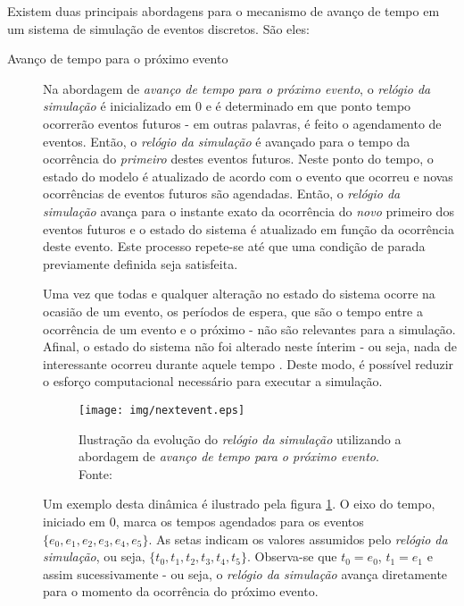 Existem duas principais abordagens para o mecanismo de avanço de tempo em um sistema de simulação de eventos discretos. São eles:

\begin{description}
\item[Avanço de tempo para o próximo evento] \hfill

Na abordagem de \textit{avanço de tempo para o próximo evento}, o
\textit{relógio da simulação} é inicializado em 0 e é determinado em que ponto
tempo ocorrerão eventos futuros - em outras palavras, é feito o agendamento de
eventos. Então, o \textit{relógio da simulação} é avançado para o tempo da
ocorrência do \textit{primeiro} destes eventos futuros. Neste ponto do tempo, o
estado do modelo é atualizado de acordo com o evento que ocorreu e novas
ocorrências de eventos futuros são agendadas. Então, o \textit{relógio da
simulação} avança para o instante exato da ocorrência do \textit{novo} primeiro
dos eventos futuros e o estado do sistema é atualizado em função da ocorrência
deste evento. Este processo repete-se até que uma condição de parada previamente
definida seja satisfeita.

Uma vez que todas e qualquer alteração no estado do sistema ocorre na ocasião de
um evento, os períodos de espera, que são o tempo entre a ocorrência de um
evento e o próximo - não são relevantes para a simulação. Afinal, o estado do
sistema não foi alterado neste ínterim - ou seja, nada de interessante ocorreu
durante aquele tempo \cite{Sim}. Deste modo, é possível reduzir o esforço
computacional necessário para executar a simulação.

\begin{figure}[htb!]
\centering\texttt{[image: img/nextevent.eps]}
\caption{\label{fig:nextevent}Ilustração da evolução do \textit{relógio da simulação} utilizando a abordagem de \textit{avanço de tempo para o próximo evento}. Fonte:~\cite{Law}}
\end{figure}

Um exemplo desta dinâmica é ilustrado pela figura \ref{fig:nextevent}. O eixo do
tempo, iniciado em 0, marca os tempos agendados para os eventos $\{e_{0}, e_{1},
e_{2}, e_{3}, e_{4}, e_{5}\}$. As setas indicam os valores assumidos pelo
\textit{relógio da simulação}, ou seja, $\{t_{0}, t_{1}, t_{2}, t_{3}, t_{4},
t_{5}\}$. Observa-se que $t_{0} = e_{0}$, $t_{1} = e_{1}$ e assim sucessivamente
- ou seja, o \textit{relógio da simulação} avança diretamente para o momento
da ocorrência do próximo evento.


\end{description}
